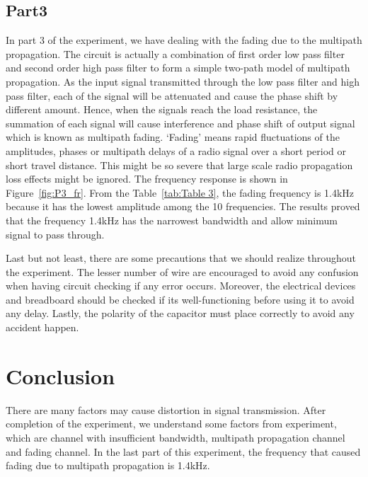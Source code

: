 \documentclass[a4paper, 12pt, english]{article}
\begin{document}
\subsection{Part3}
In part 3 of the experiment, we have dealing with the fading due to the multipath propagation. The circuit is actually a combination of first order low pass filter and second order high pass filter to form a simple two-path model of multipath propagation. As the input signal transmitted through the low pass filter and high pass filter, each of the signal will be attenuated and cause the phase shift by different amount. Hence, when the signals reach the load resistance, the summation of each signal will cause interference and phase shift of output signal which is known as multipath fading. ‘Fading’ means rapid fluctuations of the amplitudes, phases or multipath delays of a radio signal over a short period or short travel distance. This might be so severe that large scale radio propagation loss effects might be ignored. The frequency response is shown in Figure~\ref{fig:P3_fr}. From the Table~\ref{tab:Table 3}, the fading frequency is 1.4kHz because it has the lowest amplitude among the 10 frequencies. The results proved that the frequency 1.4kHz has the narrowest bandwidth and allow minimum signal to pass through.
\newline

Last but not least, there are some precautions that we should realize throughout the experiment. The lesser number of wire are encouraged to avoid any confusion when having circuit checking if any error occurs. Moreover, the electrical devices and breadboard should be checked if its well-functioning before using it to avoid any delay. Lastly, the polarity of the capacitor must place correctly to avoid any accident happen. 



\newpage
\section{Conclusion}
There are many factors may cause distortion in signal transmission. After completion of the experiment, we understand some factors from experiment, which are channel with insufficient bandwidth, multipath propagation channel and fading channel.
In the last part of this experiment, the frequency that caused fading due to multipath propagation is 1.4kHz. 
\end{document}
